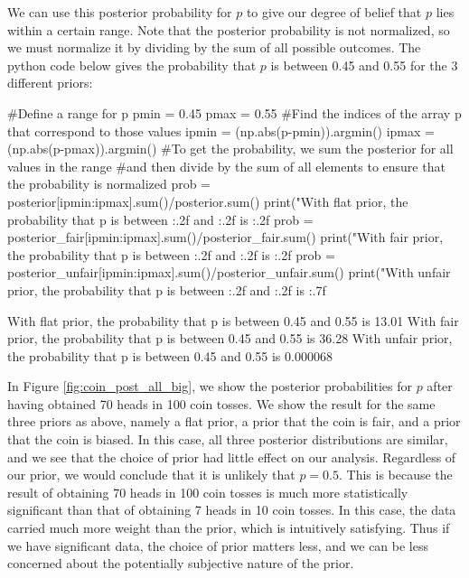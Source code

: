 We can use this posterior probability for $p$ to give our degree of belief that $p$ lies within a certain range. Note that the posterior probability is not normalized, so we must normalize it by dividing by the sum of all possible outcomes. The python code below gives the probability that $p$ is between 0.45 and 0.55 for the 3 different priors:
\begin{python}[caption = Defining a confidence range from the posterior probability]
#Define a range for p
pmin = 0.45
pmax = 0.55
#Find the indices of the array p that correspond to those values
ipmin = (np.abs(p-pmin)).argmin()
ipmax = (np.abs(p-pmax)).argmin()
#To get the probability, we sum the posterior for all values in the range
#and then divide by the sum of all elements to ensure that the probability is normalized
prob = posterior[ipmin:ipmax].sum()/posterior.sum()
print("With flat prior, the probability that p is between {:.2f} and {:.2f} is {:.2f}%
prob = posterior_fair[ipmin:ipmax].sum()/posterior_fair.sum()
print("With fair prior, the probability that p is between {:.2f} and {:.2f} is {:.2f}%
prob = posterior_unfair[ipmin:ipmax].sum()/posterior_unfair.sum()
print("With unfair prior, the probability that p is between {:.2f} and {:.2f} is {:.7f}%
\end{python}
\begin{poutput}
With flat prior, the probability that p is between 0.45 and 0.55 is 13.01%
With fair prior, the probability that p is between 0.45 and 0.55 is 36.28%
With unfair prior, the probability that p is between 0.45 and 0.55 is 0.000068%
\end{poutput}
 

In Figure \ref{fig:coin_post_all_big}, we show the posterior probabilities for $p$ after having obtained 70 heads in 100 coin tosses. We show the result for the same three priors as above, namely a flat prior, a prior that the coin is fair, and a prior that the coin is biased. In this case, all three posterior distributions are similar, and we see that the choice of prior had little effect on our analysis. Regardless of our prior, we would conclude that it is unlikely that $p=0.5$. This is because the result of obtaining 70 heads in 100 coin tosses is much more statistically significant than that of obtaining 7 heads in 10 coin tosses. In this case, the data carried much more weight than the prior, which is intuitively satisfying. Thus if we have significant data, the choice of prior matters less, and we can be less concerned about the potentially subjective nature of the prior.

